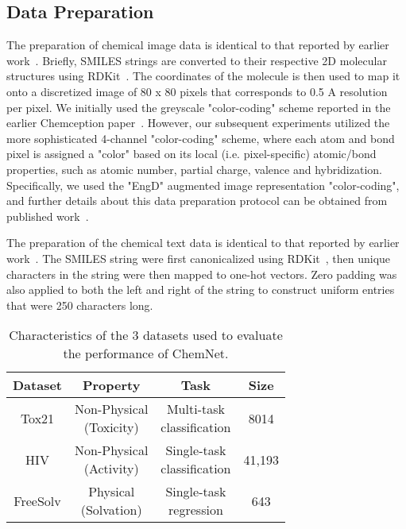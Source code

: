 \documentclass[sigconf]{acmart}
\begin{document}
\subsection{Data Preparation}
The preparation of chemical image data is identical to that reported by earlier work~\cite{goh2017c1}. Briefly, SMILES strings are converted to their respective 2D molecular structures using RDKit~\cite{landrum2016}. The coordinates of the molecule is then used to map it onto a discretized image of 80 x 80 pixels that corresponds to 0.5 A resolution per pixel. We initially used the greyscale "color-coding" scheme reported in the earlier Chemception paper~\cite{goh2017c1}. However, our subsequent experiments utilized the more sophisticated 4-channel "color-coding" scheme, where each atom and bond pixel is assigned a "color" based on its local (i.e. pixel-specific) atomic/bond properties, such as atomic number, partial charge, valence and hybridization. Specifically, we used the "EngD" augmented image representation "color-coding", and further details about this data preparation protocol can be obtained from published work~\cite{goh2017c2}.
 
The preparation of the chemical text data is identical to that reported by earlier work~\cite{goh2017s}. The SMILES string were first canonicalized using RDKit~\cite{landrum2016}, then unique characters in the string were then mapped to one-hot vectors. Zero padding was also applied to both the left and right of the string to construct uniform entries that were 250 characters long.

\begin{table}[!t] 
		\begin{center}
		\begin{tabular}{|c|c|c|c|}
				\hline
				Dataset & Property & Task & Size \\
				\hline\hline
				Tox21 & \makecell{Non-Physical \\(Toxicity)} & \makecell{Multi-task \\ classification} & 8014 \\
				\hline
				HIV & \makecell{Non-Physical \\(Activity)} & \makecell{Single-task \\ classification} & 41,193 \\
				\hline
				FreeSolv & \makecell{Physical \\(Solvation)} & \makecell{Single-task \\ regression} & 643\\
				\hline
		\end{tabular} 
		\end{center}
\caption{Characteristics of the 3 datasets used to evaluate the performance of ChemNet.}
\label{table:1}
\end{table}
\end{document}
